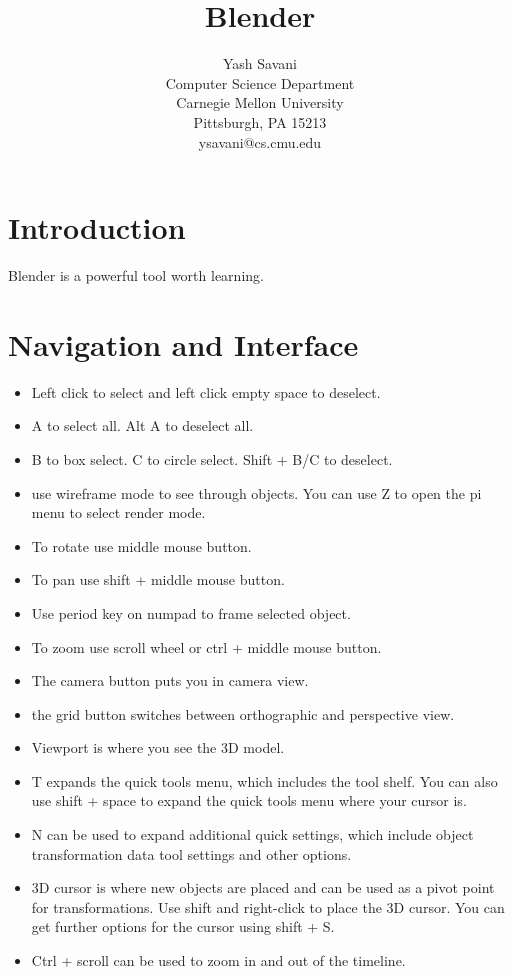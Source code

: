 \documentclass[12pt]{article}
\title{Blender}
\author{%
    Yash Savani \\
    Computer Science Department \\
    Carnegie Mellon University \\
    Pittsburgh, PA 15213 \\
    ysavani@cs.cmu.edu
}
\begin{document}
\maketitle

\section{Introduction}
Blender is a powerful tool worth learning.

\section{Navigation and Interface}
\begin{itemize}
    \item Left click to select and left click empty space to deselect.
    \item A to select all. Alt A to deselect all.
    \item B to box select. C to circle select. Shift + B/C to deselect.
    \item use wireframe mode to see through objects. You can use Z to open the pi menu to select render mode.
    \item To rotate use middle mouse button.
    \item To pan use shift + middle mouse button.
    \item Use period key on numpad to frame selected object.
    \item To zoom use scroll wheel or ctrl + middle mouse button.
    \item The camera button puts you in camera view.
    \item the grid button switches between orthographic and perspective view.
    \item Viewport is where you see the 3D model.
    \item T expands the quick tools menu, which includes the tool shelf. You can also use shift + space to expand the quick tools menu where your cursor is.
    \item N can be used to expand additional quick settings, which include object transformation data tool settings and other options.
    \item 3D cursor is where new objects are placed and can be used as a pivot point for transformations. Use shift and right-click to place the 3D cursor. You can get further options for the cursor using shift + S.
    \item Ctrl + scroll can be used to zoom in and out of the timeline.

\end{itemize}
\end{document}
